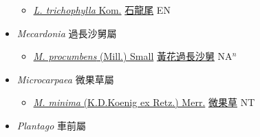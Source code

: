 \begin{itemize}
\begin{itemize}
        \item[] \href{http://www.theplantlist.org/tpl1.1/search?q=Limnophila+trichophylla}{\textit{L. trichophylla} Kom.}   \href{\detokenize{http://taibnet.sinica.edu.tw/chi/taibnet_species_list.php?T2=石龍尾&T2_new_value=true&fr=y}}{石龍尾} EN
  \end{itemize}
 \item[] \textit{Mecardonia} 過長沙舅屬
                    
  \begin{itemize}
        \item[] \href{http://www.theplantlist.org/tpl1.1/search?q=Mecardonia+procumbens}{\textit{M. procumbens} (Mill.) Small}   \href{\detokenize{http://taibnet.sinica.edu.tw/chi/taibnet_species_list.php?T2=黃花過長沙舅&T2_new_value=true&fr=y}}{黃花過長沙舅} NA$^n$
  \end{itemize}
 \item[] \textit{Microcarpaea} 微果草屬
                    
  \begin{itemize}
        \item[] \href{http://www.theplantlist.org/tpl1.1/search?q=Microcarpaea+minima}{\textit{M. minima} (K.D.Koenig ex Retz.) Merr.}   \href{\detokenize{http://taibnet.sinica.edu.tw/chi/taibnet_species_list.php?T2=微果草&T2_new_value=true&fr=y}}{微果草} NT
  \end{itemize}
 \item[] \textit{Plantago} 車前屬
                    

\end{itemize}
